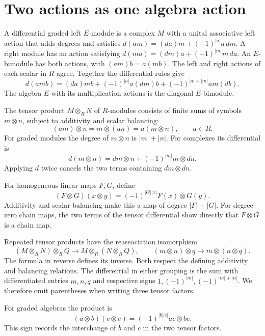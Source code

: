 \section{Two actions as one algebra action}
\label{sec:rel-bimodules}

A differential graded left $E$-module is a complex $M$ with a unital
associative left action that adds degrees and satisfies
$d(am)=(da)m+(-1)^{|a|}a\,dm$.
A right module has an action satisfying
$d(ma)=(dm)a+(-1)^{|m|}m\,da$.
An $E$-bimodule has both actions, with $(am)b=a(mb)$.
The left and right actions of each scalar in $R$ agree.
Together the differential rules give
\begin{equation}\label{eq:rel-bimodule-leibniz}
 d(amb)=(da)mb+(-1)^{|a|}a(dm)b
       +(-1)^{|a|+|m|}am(db).
\end{equation}
The algebra $E$ with its multiplication actions is the diagonal $E$-bimodule.

The tensor product $M\otimes_R N$ of $R$-modules consists of finite sums
of symbols $m\otimes n$, subject to additivity and scalar balancing:
\[
 (am)\otimes n=m\otimes(an)=a(m\otimes n),\qquad a\in R.
\]
For graded modules the degree of $m\otimes n$ is $|m|+|n|$.
For complexes its differential is
\begin{equation}\label{eq:rel-tensor-differential}
 d(m\otimes n)=dm\otimes n+(-1)^{|m|}m\otimes dn.
\end{equation}
Applying $d$ twice cancels the two terms containing $dm\otimes dn$.

For homogeneous linear maps $F,G$, define
\[
 (F\otimes G)(x\otimes y)=(-1)^{|G||x|}F(x)\otimes G(y).
\]
Additivity and scalar balancing make this a map of degree $|F|+|G|$.
For degree-zero chain maps, the two terms of the tensor differential
show directly that $F\otimes G$ is a chain map.

Repeated tensor products have the reassociation isomorphism
\[
 (M\otimes_R N)\otimes_R Q\longrightarrow
 M\otimes_R(N\otimes_R Q),\qquad
 (m\otimes n)\otimes q\longmapsto m\otimes(n\otimes q).
\]
The formula in reverse defines its inverse. Both respect the defining
additivity and balancing relations. The differential in either grouping
is the sum with differentiated entries $m,n,q$ and respective signs
$1,(-1)^{|m|},(-1)^{|m|+|n|}$.
We therefore omit parentheses when writing three tensor factors.

For graded algebras the product is
\[
 (a\otimes b)(c\otimes e)=(-1)^{|b||c|}ac\otimes be.
\]
This sign records the interchange of $b$ and $c$ in the two tensor factors.

